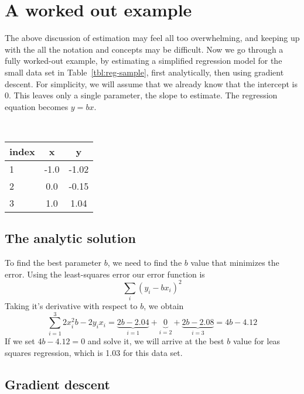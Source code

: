 \section{A worked out example}

The above discussion of estimation may feel all too overwhelming,
and keeping up with the all the notation and concepts may be difficult.
Now we go through a fully worked-out example,
by estimating a simplified regression model
for the small data set in Table~\ref{tbl:reg-sample},
first analytically,
then using gradient descent.
For simplicity, we will assume that we already know
that the intercept is \num{0}.
This leaves only a single parameter, the slope to estimate.
The regression equation becomes $y = bx$.
\begin{margintable}
  \caption{\label{tbl:reg-sample}%
    A small data set for demonstration of regression.
  }
  \centering
  ~\\[1mm]
  \begin{tabular}{lSS}
    \toprule
    index & {x} & {y} \\
     & -1.0 & -1.02 \\
    2 &  0.0 & -0.15 \\
    3 &   1.0 &  1.04 \\
    \bottomrule
  \end{tabular}
\end{margintable}

\subsection{The analytic solution}

To find the best parameter $b$,
we need to find the $b$ value that minimizes the error.
Using the least-squares error our error function is
\begin{equation*}
  \sum_{i} (y_{i} - b x_{i})^2
\end{equation*}
Taking it's derivative with respect to $b$, we obtain
\begin{equation*}
  \sum_{i=1}^{3} 2 x^{2}_{i}b - 2 y_{i} x_{i}
  = \underbrace{2b - 2.04}_{i=1} + \underbrace{0}_{i=2} + \underbrace{2b - 2.08}_{i=3}
  = 4b - 4.12
\end{equation*}
If we set $4b - 4.12 = 0$ and solve it,
we will arrive at the best $b$ value for leas squares regression,
which is 1.03 for this data set.

\subsection{Gradient descent}

